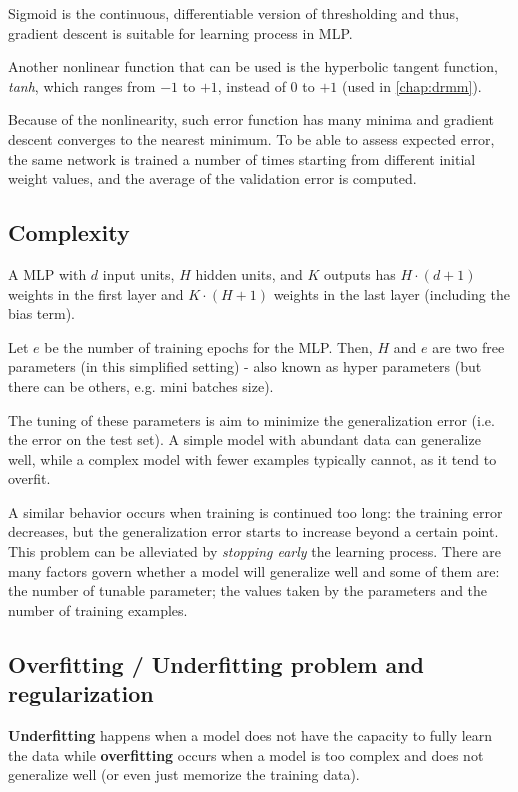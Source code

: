 Sigmoid is the continuous, differentiable version of thresholding and thus, gradient descent is suitable for learning process in MLP.

Another nonlinear function that can be used is the hyperbolic tangent function, \textit{tanh}, which ranges from $-1$ to $+1$, instead of $0$ to $+1$ (used in \ref{chap:drmm}).

Because of the nonlinearity, such error function has many minima and gradient descent converges to the nearest minimum. To be able to assess expected  error,  the  same  network  is  trained  a  number  of  times  starting from different initial weight values, and the average of the validation error is computed.

\subsection{Complexity}

A MLP with $d$ input units, $H$ hidden units, and $K$ outputs has $H \cdot (d+1)$ weights in the first layer and $K \cdot (H+1)$ weights in the last layer (including the bias term).

Let $e$ be the number of training epochs for the MLP. Then, $H$ and $e$ are two free parameters (in this simplified setting) - also known as hyper parameters (but there can be others, e.g. mini batches size).

The tuning of these parameters is aim to minimize the generalization error (i.e. the error on the test set).
A simple model with abundant data can generalize well, while a complex model with fewer examples typically cannot, as it tend to overfit.

A similar behavior occurs when training is continued  too long: the training error decreases, but the generalization error starts to increase beyond a certain point. This problem can be alleviated by \textit{stopping early} the learning process.
There are many factors govern whether a model will generalize well and some of them are: the number of tunable parameter; the values taken by the parameters and the number of training examples.

\subsection{Overfitting / Underfitting problem and regularization}

\textbf{Underfitting} happens when a model does not have the capacity to fully learn the data while \textbf{overfitting} occurs when a model is too complex and does not generalize well (or even just memorize the training data).


